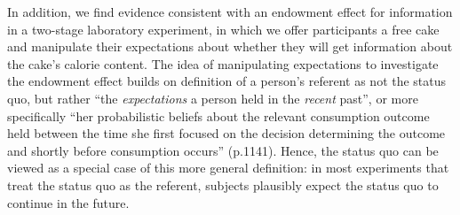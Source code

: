
In addition, we find evidence consistent with an endowment effect for information in a two-stage laboratory experiment, in which we offer participants a free cake and manipulate their expectations about whether they will get information about the cake’s calorie content. The idea of manipulating expectations to investigate the endowment effect builds on  definition of a person’s referent as not the status quo, but rather \enquote{the \emph{expectations} a person held in the \emph{recent} past}, or more specifically \enquote{her probabilistic beliefs about the relevant consumption outcome held between the time she first focused on the decision determining the outcome and shortly before consumption occurs} (p.1141). Hence, the status quo can be viewed as a special case of this more general definition: in most experiments that treat the status quo as the referent, subjects plausibly expect the status quo to continue in the future.

